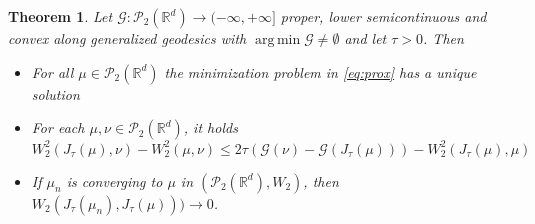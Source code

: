 \documentclass[11pt]{article}
\DeclareMathOperator*{\argmin}{arg\,min}
\newtheorem{theorem}{Theorem}[section]
\newcommand{\cP}{\mathcal{P}}
\newcommand{\cG}{\mathcal{G}}
\newcommand{\R}{\mathbb{R}}
\newcommand{\RR}{(-\infty,+\infty]}
\numberwithin{equation}{section}
\begin{document}
\begin{theorem}\label{thm:introduction}
	Let $\cG : \cP_2(\R^d) \to \RR$ proper, lower semicontinuous and convex along generalized geodesics with $\argmin \cG \neq \emptyset$ and let $\tau > 0$. Then \begin{itemize}
		\item[(i)] For all $\mu \in \cP_2(\R^d)$ the minimization problem in \eqref{eq:prox} has a unique solution
		\item[(ii)] For each $\mu, \nu \in \cP_2(\R^d)$, it holds 
		\begin{equation}\label{eq:discrete_EVI}
			W_2^2(J_{\tau}(\mu),\nu) - W_2^2(\mu,\nu) \leq 2\tau \left(\cG(\nu) -  \cG(J_{\tau}(\mu))\right) - W_2^2(J_{\tau}(\mu),\mu) 
		\end{equation}
		\item[(iii)] If $\mu_n$ is converging to $\mu$ in $(\cP_2(\R^d),W_2)$, then $W_2(J_\tau(\mu_n),J_\tau(\mu)))\to 0$.
	\end{itemize}
\end{theorem}
\end{document}
